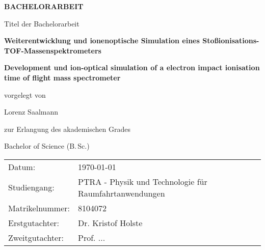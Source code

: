 {%
\pagestyle{empty}
\sffamily

\centering%

\vfill
{\bfseries\Huge BACHELORARBEIT}

\vfill
Titel der Bachelorarbeit

{\LARGE\bfseries Weiterentwicklung und ionenoptische Simulation eines Stoßionisations-TOF-Massenspektrometers}
\vfill

{\Large\bfseries Development und ion-optical simulation of a electron impact ionisation time of flight mass spectrometer}
\vfill

vorgelegt von

{\Large Lorenz Saalmann}

\vspace{15mm}

zur Erlangung des akademischen Grades

{\Large Bachelor of Science (B.\,Sc.)}
\vfill


\vspace{15mm}

\raggedright
\centering
\begin{tabular}{p{}p{}}
Datum:          & \today \\[1.0ex]
Studiengang:    &  PTRA - Physik und Technologie f\"{u}r Raumfahrtanwendungen\\[1.0ex]
Matrikelnummer: &  8104072\\[1.0ex]
Erstgutachter:  &  Dr. Kristof Holste \\[1.0ex]
Zweitgutachter: &  Prof. ... \\
\end{tabular}
\cleardoublepage
}%